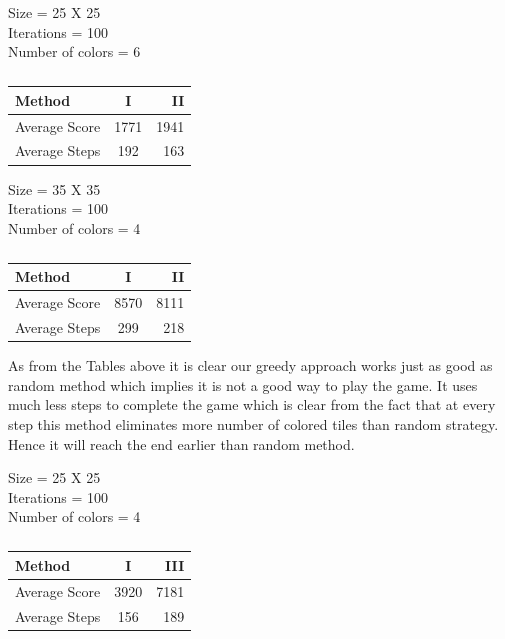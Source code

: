 \documentclass[twoside]{article}
\begin{document}
\begin{multicols}{2}
\begin{table}[H]
\caption{}
\centering
Size = 25 X 25	\\
Iterations = 100\\
Number of colors = 6	\\

\begin{tabular}{l | c | r}
\toprule
Method & I & II \\
\hline
Average Score & 1771 & 1941 \\
\hline
Average Steps & 192 & 163 \\
\hline
\bottomrule
\end{tabular}
\end{table}
\begin{table}[H]
\caption{}
\centering
Size = 35 X 35	\\
Iterations = 100\\
Number of colors = 4	\\

\begin{tabular}{l | c | r}
\toprule
Method & I & II \\
\hline
Average Score & 8570 & 8111 \\
\hline
Average Steps & 299 & 218 \\
\hline
\bottomrule
\end{tabular}
\end{table}

As from the Tables above it is clear our greedy approach works just as good as random method which implies it is not a good way to
play the game. It uses much less steps to complete the game which is clear from the fact that at every step this method eliminates
more number of colored tiles than random strategy. Hence it will reach the end earlier than random method.


\begin{table}[H]
\caption{}
Size = 25 X 25	\\
Iterations = 100\\
Number of colors = 4	\\
\centering
\begin{tabular}{l | c | r}
\toprule
Method & I & III \\
\hline
Average Score & 3920 & 7181 \\
\hline
Average Steps & 156 & 189 \\
\hline
\bottomrule
\end{tabular}
\end{table}


\end{multicols}
\end{document}

